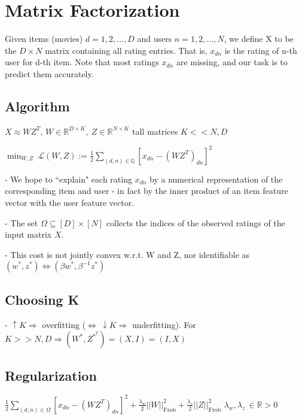 \section{Matrix Factorization}

Given items (movies) $d=1, 2, . . . , D$ and users $n= 1, 2, . . . , N$, we define X to be the $D \times N$ matrix containing all rating entries. That is, $x_{dn}$ is the rating of n-th user for d-th item.
Note that most ratings $x_{dn}$ are missing, and our task is to predict them accurately.

\subsection*{Algorithm}

$X \approx WZ^T$, $W \in \mathbb{R}^{D \times K}, \ Z \in \mathbb{R}^{N \times K}$ tall matrices $K << N, D$

$\operatorname*{min}_{W,Z}~{\mathcal{L}}(W,Z):=\frac{1}{2}\sum_{(d,n)\in\mathbb{Q}} [x_{dn}-(WZ^T)_{dn}]^2$

- We hope to ``explain" each rating $x_{dn}$ by a numerical representation of the corresponding item and user - in fact by the inner product of an item feature vector with the user feature vector.



- The set $\Omega\subseteq\left[D\right]\times\left[N\right]$ collects the indices of the observed ratings of the input matrix $X$.

- This cost is not jointly convex w.r.t. W and Z, nor identifiable as $(w^*, z^*) \Leftrightarrow (\beta w^*, \beta^{-1} z^*)$

\subsection*{Choosing K}

- $\uparrow K \Rightarrow$ overfitting ($\Leftrightarrow \ \downarrow K \Rightarrow$ underfitting). 
For $K >> N,D \Rightarrow (W^*, Z^{*^T}) = (X, I) = (I, X)$

\subsection*{Regularization}

$\frac{1}{2}\sum_{(d,n)\in\Omega}[x_{d n}-(W Z^{T})_{d n}]^{2}+\frac{\lambda_{w}}{2}||{W}||_{\mathrm{Frob}}^{2}+\frac{\lambda_{z}}{2}||{Z}||_{\mathrm{Frob}}^{2}$
$\lambda_{w},\lambda_{z}\, \in \mathbb{R} > 0$


